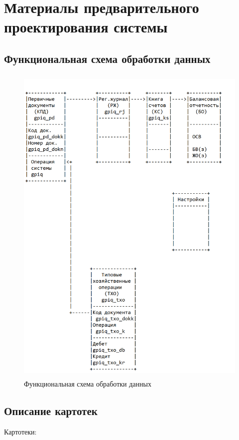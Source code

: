 \section{Материалы предварительного проектирования системы}
\subsection{Функциональная схема обработки данных}

\begin{figure}[!htb]
    \centering
    \includegraphics[height=16cm]
        {_assets/gpiq_part2.png}
    \caption{Функциональная схема обработки данных}
\end{figure}

\subsection{Описание картотек}

Картотеки:

